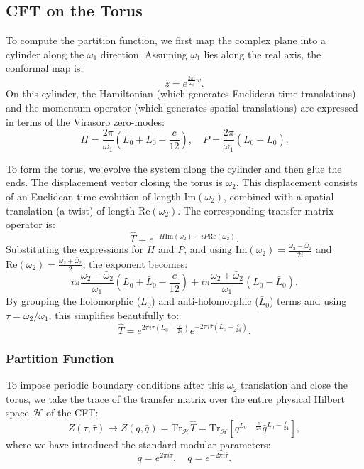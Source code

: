 \subsection{CFT on the Torus}

To compute the partition function, we first map the complex plane into a cylinder along the \(\omega_1\) direction. Assuming \(\omega_1\) lies along the real axis, the conformal map is:
\[
    z = e^{\frac{2\pi i}{\omega_1}w}.
\]
On this cylinder, the Hamiltonian (which generates Euclidean time translations) and the momentum operator (which generates spatial translations) are expressed in terms of the Virasoro zero-modes:
\[
    H = \frac{2\pi}{\omega_1} \left( L_0 + \bar{L}_0 - \frac{c}{12} \right), \quad P = \frac{2\pi}{\omega_1} \left( L_0 - \bar{L}_0 \right).
\]

To form the torus, we evolve the system along the cylinder and then glue the ends. The displacement vector closing the torus is \(\omega_2\). This displacement consists of an Euclidean time evolution of length \(\mathrm{Im}(\omega_2)\), combined with a spatial translation (a twist) of length \(\mathrm{Re}(\omega_2)\). The corresponding transfer matrix operator is:
\[
    \hat{T} = e^{-H \mathrm{Im}(\omega_2) + i P \mathrm{Re}(\omega_2)}.
\]
Substituting the expressions for \(H\) and \(P\), and using \(\mathrm{Im}(\omega_2) = \frac{\omega_2 - \bar{\omega}_2}{2i}\) and \(\mathrm{Re}(\omega_2) = \frac{\omega_2 + \bar{\omega}_2}{2}\), the exponent becomes:
\[
    i\pi \frac{\omega_2 - \bar{\omega}_2}{\omega_1} \left( L_0 + \bar{L}_0 - \frac{c}{12} \right) + i\pi \frac{\omega_2 + \bar{\omega}_2}{\omega_1} \left( L_0 - \bar{L}_0 \right).
\]
By grouping the holomorphic (\(L_0\)) and anti-holomorphic (\(\bar{L}_0\)) terms and using \(\tau = \omega_2/\omega_1\), this simplifies beautifully to:
\[
    \hat{T} = e^{2\pi i \tau \left(L_0 - \frac{c}{24}\right)} e^{-2\pi i \bar{\tau} \left(\bar{L}_0 - \frac{c}{24}\right)}.
\]

\subsubsection{Partition Function}

To impose periodic boundary conditions after this \(\omega_2\) translation and close the torus, we take the trace of the transfer matrix over the entire physical Hilbert space \(\mathcal{H}\) of the CFT:
\[
    Z(\tau, \bar{\tau}) \mapsto Z(q, \bar{q}) = \mathrm{Tr}_{\mathcal{H}} \hat{T} = \mathrm{Tr}_{\mathcal{H}} \left[ q^{L_0 - \frac{c}{24}} \bar{q}^{\bar{L}_0 - \frac{c}{24}} \right],
\]
where we have introduced the standard modular parameters:
\[
    q = e^{2\pi i \tau}, \quad \bar{q} = e^{-2\pi i \bar{\tau}}.
\]

